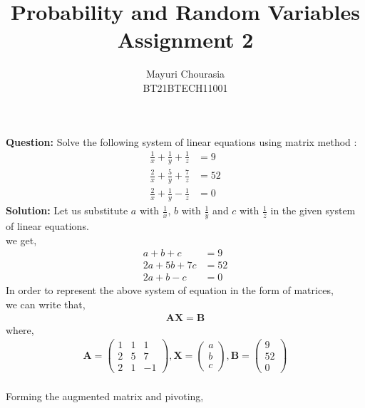 \documentclass[journal,12.00pt,twocolumn]{IEEEtran}
\title{Probability and Random Variables\\Assignment 2}
\author{Mayuri Chourasia\\BT21BTECH11001}
\date{}
\let\vec\mathbf
\newcommand{\myvec}[1]{\ensuremath{\begin{pmatrix}#1\end{pmatrix}}}
\newcommand{\question}{\noindent \textbf{Question: }}
\newcommand{\solution}{\noindent \textbf{Solution: }}
\begin{document}
\maketitle
\question Solve the following system of linear equations using matrix method :
\begin{align}
	\frac{1}{x}+\frac{1}{y}+\frac{1}{z} &= 9 \nonumber \\
	\frac{2}{x}+\frac{5}{y}+\frac{7}{z} &= 52 \nonumber \\
	\frac{2}{x}+\frac{1}{y}-\frac{1}{z} &= 0 
\nonumber
\end{align}
   \solution Let us substitute {$a$} with $\frac{1}{x}$, $b$ with $\frac{1}{y}$ and $c$ with $\frac{1}{z}$ in the given system of linear equations.\\
   we get,
   \begin{align}
       a+b+c &=9\\
       2a+5b+7c &=52\\
       2a+b-c &=0
   \end{align}
   In order to represent the above system of equation in the form of matrices,\\ we can write that, 
   \begin{align}
       \vec{A}\vec{X}=\vec{B}
   \end{align}
   where,
   \begin{align}
       \vec{A}=\myvec{1 & 1 & 1 \\ 2 & 5 & 7 \\ 2 & 1 & -1}, \vec{X}=\myvec{a\\b\\c}, \vec{B}=\myvec{9\\52\\0}
   \end{align}
   \medskip\\
   Forming the augmented matrix and pivoting,  
\end{document}
